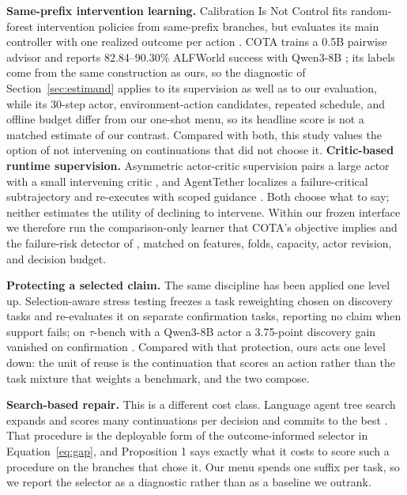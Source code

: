 \textbf{Same-prefix intervention learning.} Calibration Is Not Control fits random-forest intervention policies from same-prefix branches, but evaluates its main controller with one realized outcome per action \citep{zhang2026calibration}. COTA trains a 0.5B pairwise advisor and reports 82.84--90.30\% ALFWorld success with Qwen3-8B \citep{jiang2026cota}; its labels come from the same construction as ours, so the diagnostic of Section~\ref{sec:estimand} applies to its supervision as well as to our evaluation, while its 30-step actor, environment-action candidates, repeated schedule, and offline budget differ from our one-shot menu, so its headline score is not a matched estimate of our contrast. Compared with both, this study values the option of not intervening on continuations that did not choose it. \textbf{Critic-based runtime supervision.} Asymmetric actor-critic supervision pairs a large actor with a small intervening critic \citep{jiang2026asymac}, and AgentTether localizes a failure-critical subtrajectory and re-executes with scoped guidance \citep{zhao2026agenttether}. Both choose what to say; neither estimates the utility of declining to intervene. Within our frozen interface we therefore run the comparison-only learner that COTA's objective implies and the failure-risk detector of \citet{vasudev2026failure}, matched on features, folds, capacity, actor revision, and decision budget.

\textbf{Protecting a selected claim.} The same discipline has been applied one level up. Selection-aware stress testing freezes a task reweighting chosen on discovery tasks and re-evaluates it on separate confirmation tasks, reporting no claim when support fails; on $\tau$-bench with a Qwen3-8B actor a 3.75-point discovery gain vanished on confirmation \citep{xu2026sasst}. Compared with that protection, ours acts one level down: the unit of reuse is the continuation that scores an action rather than the task mixture that weights a benchmark, and the two compose.

\textbf{Search-based repair.} This is a different cost class. Language agent tree search expands and scores many continuations per decision and commits to the best \citep{zhou2024lats}. That procedure is the deployable form of the outcome-informed selector in Equation~\ref{eq:gap}, and Proposition 1 says exactly what it costs to score such a procedure on the branches that chose it. Our menu spends one suffix per task, so we report the selector as a diagnostic rather than as a baseline we outrank.

